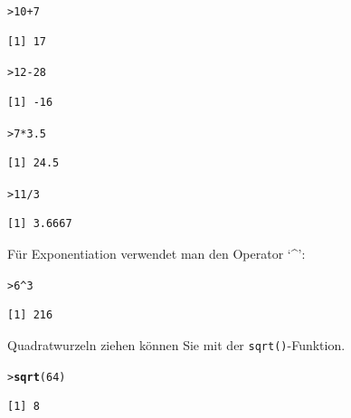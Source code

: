 \documentclass[oneside, 10pt]{book}\usepackage[]{graphicx}\usepackage[]{xcolor}
\makeatletter
\newcommand{\hlnum}[1]{\textcolor[rgb]{0.686,0.059,0.569}{#1}}%
\newcommand{\hlopt}[1]{\textcolor[rgb]{0,0,0}{#1}}%
\newcommand{\hlstd}[1]{\textcolor[rgb]{0.345,0.345,0.345}{#1}}%
\newcommand{\hlkwd}[1]{\textcolor[rgb]{0.737,0.353,0.396}{\textbf{#1}}}%
\newenvironment{kframe}{%
 \def\at@end@of@kframe{}%
 \ifinner\ifhmode%
  \def\at@end@of@kframe{\end{minipage}}%
  \begin{minipage}{\columnwidth}%
 \fi\fi%
 \def\FrameCommand##1{\hskip\@totalleftmargin \hskip-\fboxsep
 \colorbox{shadecolor}{##1}\hskip-\fboxsep
     \hskip-\linewidth \hskip-\@totalleftmargin \hskip\columnwidth}%
 \MakeFramed {\advance\hsize-\width
   \@totalleftmargin\z@ \linewidth\hsize
   \@setminipage}}%
 {\par\unskip\endMakeFramed%
 \at@end@of@kframe}
\newenvironment{knitrout}{}{} %
\makeatother
\begin{document}
\begin{knitrout}
\color{fgcolor}\begin{kframe}
\begin{alltt}
\hlstd{> }\hlnum{10} \hlopt{+} \hlnum{7}
\end{alltt}
\begin{verbatim}
[1] 17
\end{verbatim}
\begin{alltt}
\hlstd{> }\hlnum{12} \hlopt{-} \hlnum{28}
\end{alltt}
\begin{verbatim}
[1] -16
\end{verbatim}
\begin{alltt}
\hlstd{> }\hlnum{7} \hlopt{*} \hlnum{3.5}
\end{alltt}
\begin{verbatim}
[1] 24.5
\end{verbatim}
\begin{alltt}
\hlstd{> }\hlnum{11} \hlopt{/} \hlnum{3}
\end{alltt}
\begin{verbatim}
[1] 3.6667
\end{verbatim}
\end{kframe}
\end{knitrout}

Für Exponentiation verwendet man den Operator `\textasciicircum':

\begin{knitrout}
\color{fgcolor}\begin{kframe}
\begin{alltt}
\hlstd{> }\hlnum{6} \hlopt{^} \hlnum{3}
\end{alltt}
\begin{verbatim}
[1] 216
\end{verbatim}
\end{kframe}
\end{knitrout}

Quadratwurzeln ziehen können Sie mit der \texttt{sqrt()}-Funktion.

\begin{knitrout}
\color{fgcolor}\begin{kframe}
\begin{alltt}
\hlstd{> }\hlkwd{sqrt}\hlstd{(}\hlnum{64}\hlstd{)}
\end{alltt}
\begin{verbatim}
[1] 8
\end{verbatim}
\end{kframe}
\end{knitrout}
\end{document}
